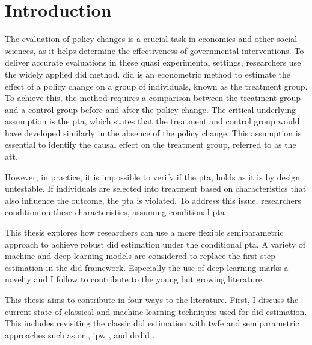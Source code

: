 \section{Introduction}



The evaluation of policy changes is a crucial task in economics and other social sciences, as it helps determine the effectiveness of governmental interventions.
To deliver accurate evaluations in these quasi experimental settings, researchers use the widely applied \ac{did} method.
\ac{did} is an econometric method to estimate the effect of a policy change on a group of individuals, known as the treatment group.
To achieve this, the method requires a comparison between the treatment group and a control group before and after the policy change.
The critical underlying assumption is the \ac{pta}, which states that the treatment and control group would have developed similarly in the absence of the policy change.
This assumption is essential to identify the causal effect on the treatment group, referred to as the \ac{att}.

However, in practice, it is impossible to verify if the \ac{pta}, holds as it is by design untestable.
If individuals are selected into treatment based on characteristics that also influence the outcome, the \ac{pta} is violated.
To address  this issue, researchers condition on these characteristics, assuming conditional \ac{pta} \citep[see][]{santannaDoublyRobustDifferenceindifferences2020,manfeDifferenceInDifferenceDesignRepeated}

This thesis explores how researchers can use a more flexible semiparametric approach to achieve robust \ac{did} estimation under the conditional \ac{pta}.
A variety of machine and deep learning models are considered to replace the first-step estimation in the \ac{did} framework.
Especially the use of deep learning marks a novelty and I follow \citet{farrellDeepNeuralNetworks2021} to contribute to the young but growing literature.



%
This thesis aims to contribute in four ways to the literature.
First, I discuss the current state of classical and machine learning techniques used for \ac{did} estimation.
This includes revisiting the classic \ac{did} estimation with \ac{twfe} and semiparametric approaches such as \ac{or} \citep[see][]{heckmanMatchingEconometricEvaluation1998}, \ac{ipw} \citep[see][]{abadieSemiparametricDifferenceinDifferencesEstimators2005}, and \ac{drdid} \citep[see][]{santannaDoublyRobustDifferenceindifferences2020}.


